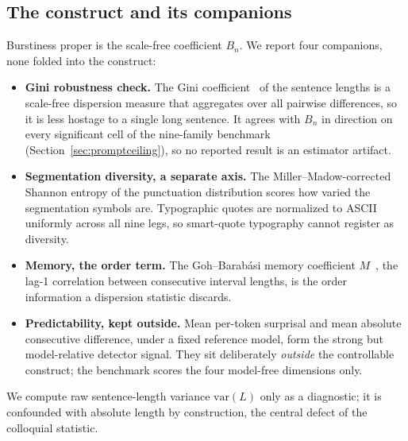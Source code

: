 \documentclass{article}
\begin{document}
\subsection{The construct and its companions}
Burstiness proper is the scale-free coefficient $B_n$. We report four companions, none folded into
the construct:
\begin{itemize}
\item \textbf{Gini robustness check.} The Gini coefficient~\citep{gini1912variabilit} of the sentence
lengths is a scale-free dispersion measure that aggregates over all pairwise differences, so it is
less hostage to a single long sentence. It agrees with $B_n$ in direction on every significant cell
of the nine-family benchmark (Section~\ref{sec:promptceiling}), so no reported result is an
estimator artifact.
\item \textbf{Segmentation diversity, a separate axis.} The Miller--Madow-corrected Shannon entropy of
the punctuation distribution scores how varied the segmentation symbols are. Typographic quotes are
normalized to ASCII uniformly across all nine legs, so smart-quote typography cannot register as
diversity.
\item \textbf{Memory, the order term.} The Goh--Barab\'asi memory coefficient
$M$~\citep{goh2008burstiness}, the lag-1 correlation between consecutive interval lengths, is the
order information a dispersion statistic discards.
\item \textbf{Predictability, kept outside.} Mean per-token surprisal and mean absolute consecutive
difference, under a fixed reference model, form the strong but model-relative detector signal. They
sit deliberately \emph{outside} the controllable construct; the benchmark scores the four model-free
dimensions only.
\end{itemize}
We compute raw sentence-length variance $\mathrm{var}(L)$ only as a diagnostic; it is confounded with
absolute length by construction, the central defect of the colloquial statistic.
\end{document}
